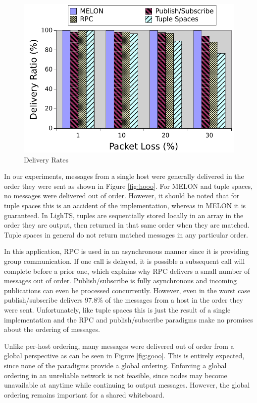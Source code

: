\begin{figure}
\centering
\includegraphics[width = \textwidth]{figures/delivery.pdf}
\caption{Delivery Rates}
\label{fig:delivery}
\end{figure}

In our experiments, messages from a single host were generally delivered in the order they were sent as shown in Figure \ref{fig:hooo}. For MELON and tuple spaces, no messages were delivered out of order. However, it should be noted that for tuple spaces this is an accident of the implementation, whereas in MELON it is guaranteed. In LighTS, tuples are sequentially stored locally in an array in the order they are output, then returned in that same order when they are matched. Tuple spaces in general do not return matched messages in any particular order.

In this application, RPC is used in an asynchronous manner since it is providing group communication. If one call is delayed, it is possible a subsequent call will complete before a prior one, which explains why RPC delivers a small number of messages out of order. Publish/subscribe is fully asynchronous and incoming publications can even be processed concurrently. However, even in the worst case publish/subscribe delivers 97.8\% of the messages from a host in the order they were sent. Unfortunately, like tuple spaces this is just the result of a single implementation and the RPC and publish/subscribe paradigms make no promises about the ordering of messages.

Unlike per-host ordering, many messages were delivered out of order from a global perspective as can be seen in Figure \ref{fig:gooo}. This is entirely expected, since none of the paradigms provide a global ordering. Enforcing a global ordering in an unreliable network is not feasible, since nodes may become unavailable at anytime while continuing to output messages. However, the global ordering remains important for a shared whiteboard.

